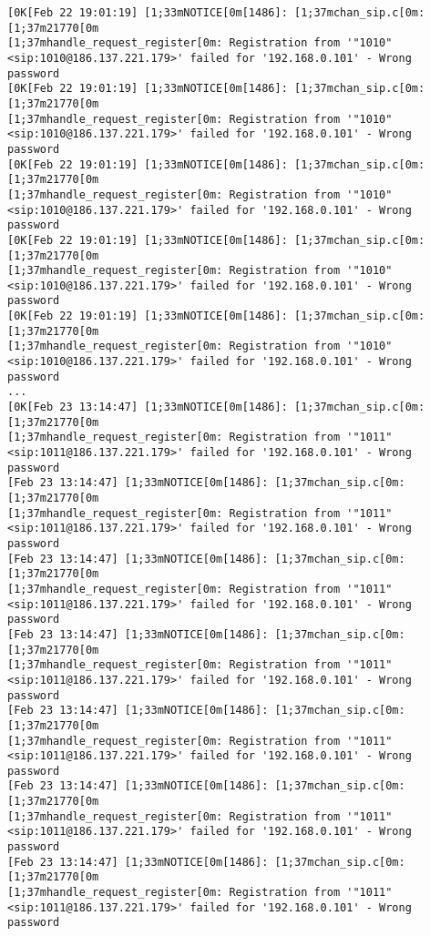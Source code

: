 \documentclass[a4paper,12pt]{report}
\newenvironment{myscriptlisting}
{\begin{list}{}{\setlength{\leftmargin}{1em}}\item\scriptsize\bfseries}
{\end{list}}
\begin{document}
{\begin{myscriptlisting}
 \begin{verbatim}
[0K[Feb 22 19:01:19] [1;33mNOTICE[0m[1486]: [1;37mchan_sip.c[0m:[1;37m21770[0m
[1;37mhandle_request_register[0m: Registration from '"1010"
<sip:1010@186.137.221.179>' failed for '192.168.0.101' - Wrong password
[0K[Feb 22 19:01:19] [1;33mNOTICE[0m[1486]: [1;37mchan_sip.c[0m:[1;37m21770[0m
[1;37mhandle_request_register[0m: Registration from '"1010"
<sip:1010@186.137.221.179>' failed for '192.168.0.101' - Wrong password
[0K[Feb 22 19:01:19] [1;33mNOTICE[0m[1486]: [1;37mchan_sip.c[0m:[1;37m21770[0m
[1;37mhandle_request_register[0m: Registration from '"1010"
<sip:1010@186.137.221.179>' failed for '192.168.0.101' - Wrong password
[0K[Feb 22 19:01:19] [1;33mNOTICE[0m[1486]: [1;37mchan_sip.c[0m:[1;37m21770[0m
[1;37mhandle_request_register[0m: Registration from '"1010"
<sip:1010@186.137.221.179>' failed for '192.168.0.101' - Wrong password
[0K[Feb 22 19:01:19] [1;33mNOTICE[0m[1486]: [1;37mchan_sip.c[0m:[1;37m21770[0m
[1;37mhandle_request_register[0m: Registration from '"1010"
<sip:1010@186.137.221.179>' failed for '192.168.0.101' - Wrong password
...
[0K[Feb 23 13:14:47] [1;33mNOTICE[0m[1486]: [1;37mchan_sip.c[0m:[1;37m21770[0m
[1;37mhandle_request_register[0m: Registration from '"1011"
<sip:1011@186.137.221.179>' failed for '192.168.0.101' - Wrong password
[Feb 23 13:14:47] [1;33mNOTICE[0m[1486]: [1;37mchan_sip.c[0m:[1;37m21770[0m
[1;37mhandle_request_register[0m: Registration from '"1011"
<sip:1011@186.137.221.179>' failed for '192.168.0.101' - Wrong password
[Feb 23 13:14:47] [1;33mNOTICE[0m[1486]: [1;37mchan_sip.c[0m:[1;37m21770[0m
[1;37mhandle_request_register[0m: Registration from '"1011"
<sip:1011@186.137.221.179>' failed for '192.168.0.101' - Wrong password
[Feb 23 13:14:47] [1;33mNOTICE[0m[1486]: [1;37mchan_sip.c[0m:[1;37m21770[0m
[1;37mhandle_request_register[0m: Registration from '"1011"
<sip:1011@186.137.221.179>' failed for '192.168.0.101' - Wrong password
[Feb 23 13:14:47] [1;33mNOTICE[0m[1486]: [1;37mchan_sip.c[0m:[1;37m21770[0m
[1;37mhandle_request_register[0m: Registration from '"1011"
<sip:1011@186.137.221.179>' failed for '192.168.0.101' - Wrong password
[Feb 23 13:14:47] [1;33mNOTICE[0m[1486]: [1;37mchan_sip.c[0m:[1;37m21770[0m
[1;37mhandle_request_register[0m: Registration from '"1011"
<sip:1011@186.137.221.179>' failed for '192.168.0.101' - Wrong password
[Feb 23 13:14:47] [1;33mNOTICE[0m[1486]: [1;37mchan_sip.c[0m:[1;37m21770[0m
[1;37mhandle_request_register[0m: Registration from '"1011"
<sip:1011@186.137.221.179>' failed for '192.168.0.101' - Wrong password

\end{verbatim}
\end{myscriptlisting}}
\end{document}
